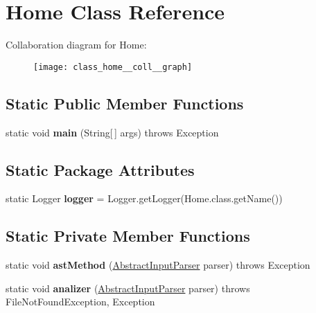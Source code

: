 \hypertarget{class_home}{\section{Home Class Reference}
\label{class_home}
}


Collaboration diagram for Home\-:
\nopagebreak
\begin{figure}[H]
\begin{center}
\leavevmode
\texttt{[image: class\_home\_\_coll\_\_graph]}
\end{center}
\end{figure}
\subsection*{Static Public Member Functions}
\begin{DoxyCompactItemize}
\item 
\hypertarget{class_home_a824a2d585cb36f1a452ebc5db9b49ed0}{static void {\bfseries main} (String\mbox{[}$\,$\mbox{]} args)  throws Exception}\label{class_home_a824a2d585cb36f1a452ebc5db9b49ed0}

\end{DoxyCompactItemize}
\subsection*{Static Package Attributes}
\begin{DoxyCompactItemize}
\item 
\hypertarget{class_home_ac74d97ae59ddf53153a62e8790619756}{static Logger {\bfseries logger} = Logger.\-get\-Logger(Home.\-class.\-get\-Name())}\label{class_home_ac74d97ae59ddf53153a62e8790619756}

\end{DoxyCompactItemize}
\subsection*{Static Private Member Functions}
\begin{DoxyCompactItemize}
\item 
\hypertarget{class_home_ac6c6a408dc24c30d02945cd67403d6d1}{static void {\bfseries ast\-Method} (\hyperlink{classinput_parser_1_1_abstract_input_parser}{Abstract\-Input\-Parser} parser)  throws Exception }\label{class_home_ac6c6a408dc24c30d02945cd67403d6d1}

\item 
\hypertarget{class_home_a207d973f0026822784672e07478745aa}{static void {\bfseries analizer} (\hyperlink{classinput_parser_1_1_abstract_input_parser}{Abstract\-Input\-Parser} parser)  throws File\-Not\-Found\-Exception, Exception }\label{class_home_a207d973f0026822784672e07478745aa}

\end{DoxyCompactItemize}


